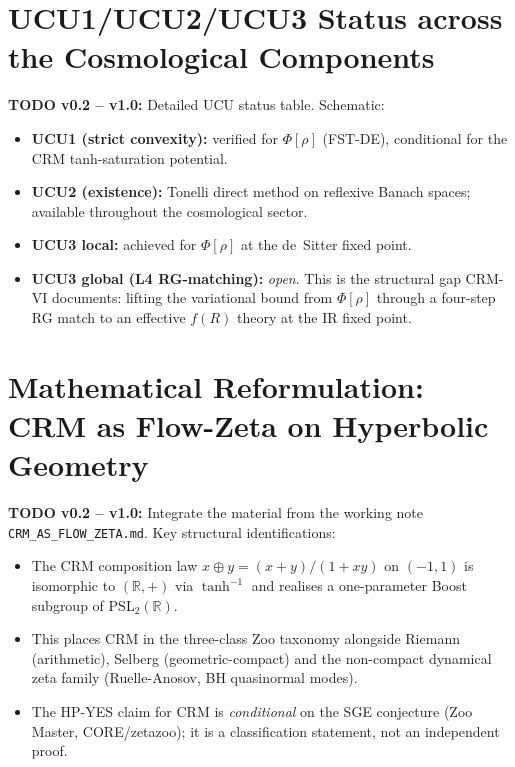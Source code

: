\documentclass[11pt,a4paper]{article}
\theoremstyle{remark}
\begin{document}
\section{UCU1/UCU2/UCU3 Status across the Cosmological Components}
\label{sec:ucu-status}

\textbf{TODO v0.2 -- v1.0:} Detailed UCU status table.
Schematic:

\begin{itemize}
\item \textbf{UCU1 (strict convexity):} verified for $\Phi[\rho]$
  (FST-DE), conditional for the CRM tanh-saturation potential.
\item \textbf{UCU2 (existence):} Tonelli direct method on
  reflexive Banach spaces; available throughout the cosmological
  sector.
\item \textbf{UCU3 local:} achieved for $\Phi[\rho]$ at the de~Sitter
  fixed point.
\item \textbf{UCU3 global (L4 RG-matching):} \emph{open}. This is
  the structural gap CRM-VI documents: lifting the variational bound
  from $\Phi[\rho]$ through a four-step RG match to an effective
  $f(R)$ theory at the IR fixed point.
\end{itemize}

\section{Mathematical Reformulation: CRM as Flow-Zeta on Hyperbolic
Geometry}
\label{sec:flow-zeta}

\textbf{TODO v0.2 -- v1.0:} Integrate the material from the working
note \texttt{CRM\_AS\_FLOW\_ZETA.md}. Key structural identifications:

\begin{itemize}
\item The CRM composition law $x \oplus y = (x+y)/(1+xy)$ on
  $(-1,1)$ is isomorphic to $(\mathbb{R}, +)$ via $\tanh^{-1}$ and
  realises a one-parameter Boost subgroup of $\mathrm{PSL}_2(\mathbb{R})$.
\item This places CRM in the three-class Zoo taxonomy alongside
  Riemann (arithmetic), Selberg (geometric-compact) and the
  non-compact dynamical zeta family (Ruelle-Anosov, BH quasinormal
  modes).
\item The HP-YES claim for CRM is \emph{conditional} on the SGE
  conjecture (Zoo Master, CORE/zetazoo); it is a classification
  statement, not an independent proof.
\end{itemize}
\end{document}
